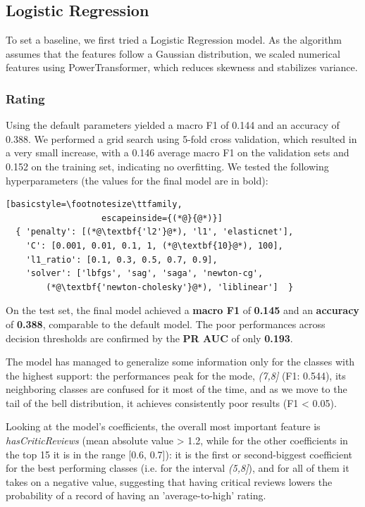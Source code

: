 \subsection{Logistic Regression}
To set a baseline, we first tried a Logistic Regression model. As the algorithm assumes that the features follow a Gaussian distribution, we scaled numerical features using PowerTransformer, which reduces skewness and stabilizes variance.

\subsubsection{Rating}
Using the default parameters yielded a macro F1 of 0.144 and an accuracy of 0.388. We performed a grid search using 5-fold cross validation, which resulted in a very small increase, with a 0.146 average macro F1 on the validation sets and 0.152 on the training set, indicating no overfitting.
We tested the following hyperparameters (the values for the final model are in bold):
\begin{lstlisting}[basicstyle=\footnotesize\ttfamily,
                   escapeinside={(*@}{@*)}]
  { 'penalty': [(*@\textbf{'l2'}@*), 'l1', 'elasticnet'],
    'C': [0.001, 0.01, 0.1, 1, (*@\textbf{10}@*), 100],
    'l1_ratio': [0.1, 0.3, 0.5, 0.7, 0.9],
    'solver': ['lbfgs', 'sag', 'saga', 'newton-cg',
        (*@\textbf{'newton-cholesky'}@*), 'liblinear']  }
\end{lstlisting}

On the test set, the final model achieved a \textbf{macro F1} of\textbf{ 0.145} and an \textbf{accuracy} of \textbf{0.388}, comparable to the default model. The poor performances across decision thresholds are confirmed by the \textbf{PR AUC} of only \textbf{0.193}.

The model has managed to generalize some information only for the classes with the highest support: the performances peak for the mode, \textit{(7,8]} (F1: 0.544), its neighboring classes are confused for it most of the time, and as we move to the tail of the bell distribution, it achieves consistently poor results (F1 < 0.05).

Looking at the model's coefficients, the overall most important feature is \textit{hasCriticReviews} (mean absolute value > 1.2, while for the other coefficients in the top 15 it is in the range [0.6, 0.7]): it is the first or second-biggest coefficient for the best performing classes (i.e. for the interval \textit{(5,8]}), and for all of them it takes on a negative value, suggesting that having critical reviews lowers the probability of a record of having an 'average-to-high' rating.

